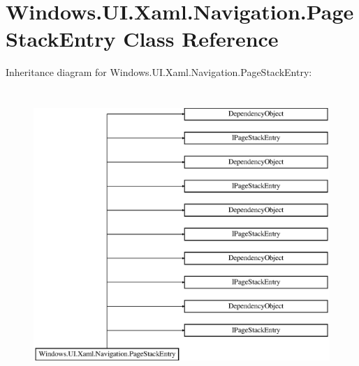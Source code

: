 \hypertarget{class_windows_1_1_u_i_1_1_xaml_1_1_navigation_1_1_page_stack_entry}{}\section{Windows.\+U\+I.\+Xaml.\+Navigation.\+Page\+Stack\+Entry Class Reference}
\label{class_windows_1_1_u_i_1_1_xaml_1_1_navigation_1_1_page_stack_entry}
Inheritance diagram for Windows.\+U\+I.\+Xaml.\+Navigation.\+Page\+Stack\+Entry\+:\begin{figure}[H]
\begin{center}
\leavevmode
\includegraphics[height=11.000000cm]{class_windows_1_1_u_i_1_1_xaml_1_1_navigation_1_1_page_stack_entry}
\end{center}
\end{figure}
